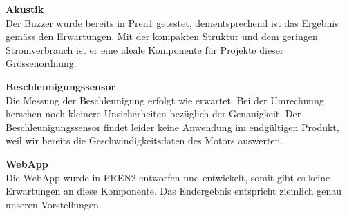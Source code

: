 \documentclass[../../main.tex]{subfiles}
\begin{document}
\textbf{Akustik}\\
Der Buzzer wurde bereits in Pren1 getestet, dementsprechend ist das Ergebnis gemäss den Erwartungen. Mit der kompakten Struktur und dem geringen Stromverbrauch ist er eine ideale Komponente für Projekte dieser Grössenordnung.

\textbf{Beschleunigungssensor}\\
Die Messung der Beschleunigung erfolgt wie erwartet. Bei der Umrechnung herschen noch kleinere Unsicherheiten bezüglich der Genauigkeit. Der Beschleunigungssensor findet leider keine Anwendung im endgültigen Produkt, weil wir bereits die Geschwindigkeitsdaten des Motors auswerten.

\textbf{WebApp}\\
Die WebApp wurde in PREN2 entworfen und entwickelt, somit gibt es keine Erwartungen an diese Komponente. Das Endergebnis entspricht ziemlich genau unseren Vorstellungen.
\end{document}
